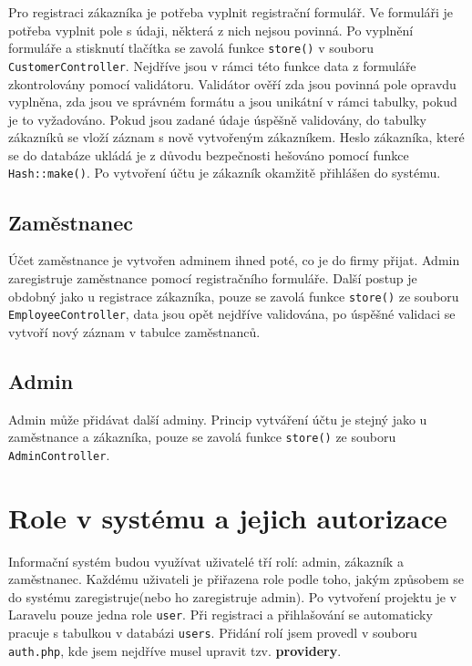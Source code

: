 Pro registraci zákazníka je potřeba vyplnit registrační formulář. Ve formuláři je potřeba vyplnit pole s údaji, některá z nich nejsou povinná. Po vyplnění formuláře a stisknutí tlačítka se zavolá funkce \texttt{store()} v souboru \texttt{CustomerController}. Nejdříve jsou v rámci této funkce data z formuláře zkontrolovány pomocí validátoru. Validátor ověří zda jsou povinná pole opravdu vyplněna, zda jsou ve správném formátu a jsou unikátní v rámci tabulky, pokud je to vyžadováno. Pokud jsou zadané údaje úspěšně validovány, do tabulky zákazníků se vloží záznam s nově vytvořeným zákazníkem. Heslo zákazníka, které se do databáze ukládá je z důvodu bezpečnosti hešováno pomocí funkce \texttt{Hash::make()}. Po vytvoření účtu je zákazník okamžitě přihlášen do systému.

\subsection{Zaměstnanec}

Účet zaměstnance je vytvořen adminem ihned poté, co je do firmy přijat. Admin zaregistruje zaměstnance pomocí registračního formuláře. Další postup je obdobný jako u registrace zákazníka, pouze se zavolá funkce \texttt{store()} ze souboru \texttt{EmployeeController}, data jsou opět nejdříve validována, po úspěšné validaci se vytvoří nový záznam v tabulce zaměstnanců. 

\subsection{Admin}

Admin může přidávat další adminy. Princip vytváření účtu je stejný jako u zaměstnance a zákazníka, pouze se zavolá funkce \texttt{store()} ze souboru \texttt{AdminController}.

\section{Role v systému a jejich autorizace}

Informační systém budou využívat uživatelé tří rolí: admin, zákazník a zaměstnanec. Každému uživateli je přiřazena role podle toho, jakým způsobem se do systému zaregistruje(nebo ho zaregistruje admin). Po vytvoření projektu je v Laravelu pouze jedna role \texttt{user}. Při registraci a přihlašování se automaticky pracuje s tabulkou v databázi \texttt{users}.  Přidání rolí jsem provedl v souboru \texttt{auth.php}, kde jsem nejdříve musel upravit tzv. \textbf{providery}.


